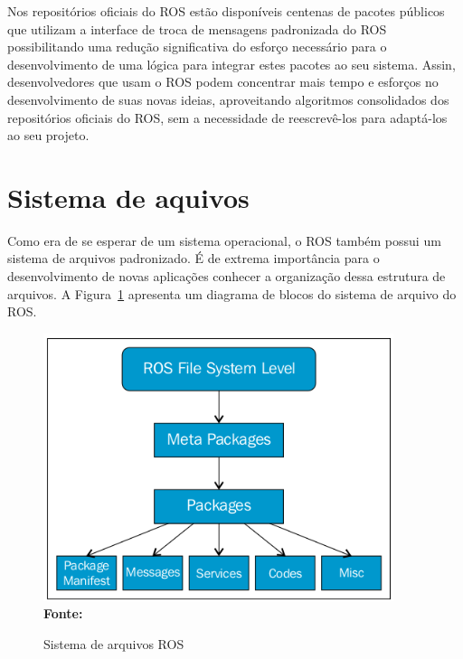 Nos repositórios oficiais do ROS estão disponíveis centenas de pacotes públicos que utilizam a interface de troca de mensagens padronizada do ROS possibilitando uma redução significativa do esforço necessário para o desenvolvimento de uma lógica para integrar estes pacotes ao seu sistema. Assin, desenvolvedores que usam o ROS podem concentrar mais tempo e esforços no desenvolvimento de suas novas ideias, aproveitando algoritmos consolidados dos repositórios oficiais do ROS, sem a necessidade de reescrevê-los para adaptá-los ao seu projeto.




\section{Sistema de aquivos}
Como era de se esperar de um sistema operacional, o ROS também possui um sistema de arquivos padronizado. É de extrema importância para o desenvolvimento de novas aplicações conhecer a organização dessa estrutura de arquivos. A Figura~\ref{fig:rosfile} apresenta um diagrama de blocos do sistema de arquivo do ROS\@.

\begin{figure}[ht]
	\caption{Sistema de arquivos ROS}
	\begin{center}
		\includegraphics[scale=0.7]{imagens/fileSiystem.png}\\
		{\small \textbf{Fonte:} }
    \end{center}\label{fig:rosfile}
\end{figure}

